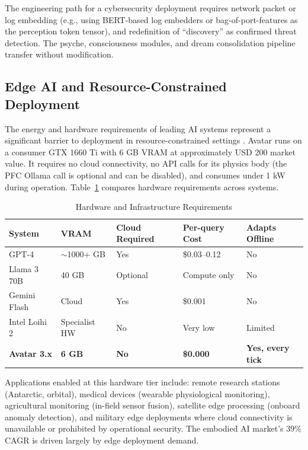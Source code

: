 \documentclass[12pt,a4paper]{article}
\begin{document}
The engineering path for a cybersecurity deployment requires network packet or log
embedding (e.g., using BERT-based log embedders or bag-of-port-features as the
perception token tensor), and redefinition of ``discovery'' as confirmed threat
detection. The psyche, consciousness modules, and dream consolidation pipeline transfer
without modification.

\subsection{Edge AI and Resource-Constrained Deployment}

The energy and hardware requirements of leading AI systems represent a significant barrier
to deployment in resource-constrained settings \cite{neuromorphic2025}. Avatar runs on a
consumer GTX 1660 Ti with 6 GB VRAM at approximately USD 200 market value. It requires no
cloud connectivity, no API calls for its physics body (the PFC Ollama call is optional and
can be disabled), and consumes under 1 kW during operation. Table~\ref{tab:edge} compares
hardware requirements across systems.

\begin{table}[H]
\centering
\caption{Hardware and Infrastructure Requirements}
\label{tab:edge}
\small
\renewcommand{\arraystretch}{1.3}
\begin{tabularx}{\textwidth}{lXXXX}
\toprule
\rowcolor{avatarblue!15}
\textbf{System} & \textbf{VRAM} & \textbf{Cloud Required} & \textbf{Per-query Cost} & \textbf{Adapts Offline} \\
\midrule
GPT-4 & $\sim$1000+ GB & Yes & \$0.03--0.12 & No \\
\rowcolor{rowalt}
Llama 3 70B & 40 GB & Optional & Compute only & No \\
Gemini Flash & Cloud & Yes & \$0.001 & No \\
\rowcolor{rowalt}
Intel Loihi 2 & Specialist HW & No & Very low & Limited \\
\textbf{Avatar 3.x} & \textbf{6 GB} & \textbf{No} & \textbf{\$0.000} & \textbf{Yes, every tick} \\
\bottomrule
\end{tabularx}
\end{table}

Applications enabled at this hardware tier include: remote research stations (Antarctic,
orbital), medical devices (wearable physiological monitoring), agricultural
monitoring (in-field sensor fusion), satellite edge processing (onboard anomaly
detection), and military edge deployments where cloud connectivity is unavailable or
prohibited by operational security. The embodied AI market's 39\% CAGR
\cite{marketembodied2025} is driven largely by edge deployment demand.
\end{document}
